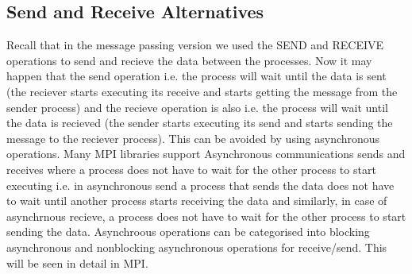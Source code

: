 \documentclass[12pt]{article}
\begin{document}
\subsection{Send and Receive Alternatives}
Recall that in the message passing version we used the SEND and RECEIVE operations to send and recieve the data between the processes.
Now it may happen that the send operation i.e. the process will wait until the data is sent (the reciever starts executing its receive and starts getting the message from the sender process) 
and the recieve operation is also i.e. the process will wait until the data is recieved (the sender starts executing its send and starts sending the message to the reciever process).
This can be avoided by using asynchronous operations. Many MPI libraries support Asynchronous communications sends and receives
where a process does not have to wait for the other process to start executing i.e. in asynchronous send a process that sends the data does not have to wait until another process starts receiving the data and similarly, in case of asynchrnous recieve,
a process does not have to wait for the other process to start sending the data. 
Asynchroous operations can be categorised into blocking asynchronous and nonblocking asynchronous operations for receive/send. This will be seen in detail in MPI.
\end{document}

